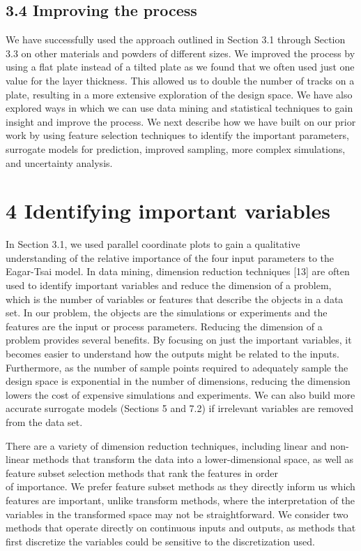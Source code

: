 \documentclass[10pt]{article}
\begin{document}
\subsection*{3.4 Improving the process}
We have successfully used the approach outlined in Section 3.1 through Section 3.3 on other materials and powders of different sizes. We improved the process by using a flat plate instead of a tilted plate as we found that we often used just one value for the layer thickness. This allowed us to double the number of tracks on a plate, resulting in a more extensive exploration of the design space. We have also explored ways in which we can use data mining and statistical techniques to gain insight and improve the process. We next describe how we have built on our prior work by using feature selection techniques to identify the important parameters, surrogate models for prediction, improved sampling, more complex simulations, and uncertainty analysis.

\section*{4 Identifying important variables}
In Section 3.1, we used parallel coordinate plots to gain a qualitative understanding of the relative importance of the four input parameters to the Eagar-Tsai model. In data mining, dimension reduction techniques [13] are often used to identify important variables and reduce the dimension of a problem, which is the number of variables or features that describe the objects in a data set. In our problem, the objects are the simulations or experiments and the features are the input or process parameters. Reducing the dimension of a problem provides several benefits. By focusing on just the important variables, it becomes easier to understand how the outputs might be related to the inputs. Furthermore, as the number of sample points required to adequately sample the design space is exponential in the number of dimensions, reducing the dimension lowers the cost of expensive simulations and experiments. We can also build more accurate surrogate models (Sections 5 and 7.2) if irrelevant variables are removed from the data set.

There are a variety of dimension reduction techniques, including linear and non-linear methods that transform the data into a lower-dimensional space, as well as feature subset selection methods that rank the features in order\\
of importance. We prefer feature subset methods as they directly inform us which features are important, unlike transform methods, where the interpretation of the variables in the transformed space may not be straightforward. We consider two methods that operate directly on continuous inputs and outputs, as methods that first discretize the variables could be sensitive to the discretization used.
\end{document}
